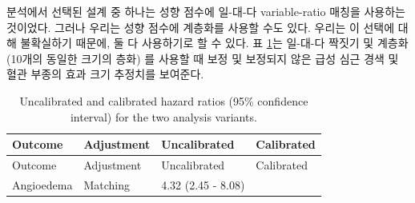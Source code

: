 \documentclass[10.5pt]{book}
\theoremstyle{definition}
\theoremstyle{definition}
\theoremstyle{definition}
\theoremstyle{remark}
\begin{document}
분석에서 선택된 설계 중 하나는 성향 점수에 일-대-다 variable-ratio
매칭을 사용하는 것이었다. 그러나 우리는 성향 점수에 계층화를 사용할 수도
있다. 우리는 이 선택에 대해 불확실하기 때문에, 둘 다 사용하기로 할 수
있다. 표 \ref{tab:sensAnalysis}는 일-대-다 짝짓기 및 계층화 (10개의
동일한 크기의 층화) 를 사용할 때 보정 및 보정되지 않은 급성 심근 경색 및
혈관 부종의 효과 크기 추정치를 보여준다.

\begin{longtable}[]{@{}llll@{}}
\caption{\label{tab:sensAnalysis} Uncalibrated and calibrated hazard ratios
(95\% confidence interval) for the two analysis
variants.}\tabularnewline
\toprule
\begin{minipage}[b]{0.27\columnwidth}\raggedright\strut
Outcome\strut
\end{minipage} & \begin{minipage}[b]{0.15\columnwidth}\raggedright\strut
Adjustment\strut
\end{minipage} & \begin{minipage}[b]{0.17\columnwidth}\raggedright\strut
Uncalibrated\strut
\end{minipage} & \begin{minipage}[b]{0.17\columnwidth}\raggedright\strut
Calibrated\strut
\end{minipage}\tabularnewline
\midrule
\endfirsthead
\toprule
\begin{minipage}[b]{0.27\columnwidth}\raggedright\strut
Outcome\strut
\end{minipage} & \begin{minipage}[b]{0.15\columnwidth}\raggedright\strut
Adjustment\strut
\end{minipage} & \begin{minipage}[b]{0.17\columnwidth}\raggedright\strut
Uncalibrated\strut
\end{minipage} & \begin{minipage}[b]{0.17\columnwidth}\raggedright\strut
Calibrated\strut
\end{minipage}\tabularnewline
\midrule
\endhead
\begin{minipage}[t]{0.27\columnwidth}\raggedright\strut
Angioedema\strut
\end{minipage} & \begin{minipage}[t]{0.15\columnwidth}\raggedright\strut
Matching\strut
\end{minipage} & \begin{minipage}[t]{0.17\columnwidth}\raggedright\strut
4.32 (2.45 - 8.08)\strut
\end{minipage} & \begin{minipage}[t]{0.17\columnwidth}\raggedright\strut

\end{minipage}
\end{longtable}
\end{document}
